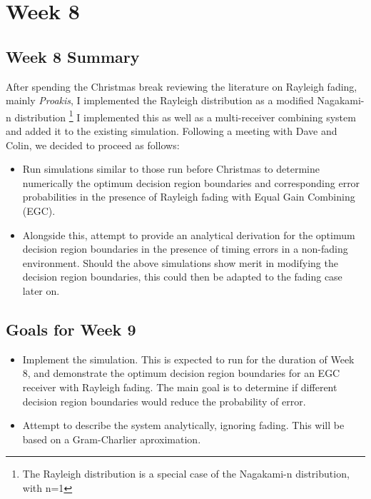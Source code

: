 \section{Week 8}

\subsection{Week 8 Summary}

After spending the Christmas break reviewing the literature on Rayleigh
fading, mainly \emph{Proakis}, I implemented the Rayleigh distribution
as a modified Nagakami-n distribution
\footnote{The Rayleigh distribution is a special case of the Nagakami-n distribution, with n=1}
I implemented this as well as a multi-receiver combining system and
added it to the existing simulation. Following a meeting with Dave and
Colin, we decided to proceed as follows:

\begin{itemize}
\itemsep1pt\parskip0pt
\item
  Run simulations similar to those run before Christmas to determine
  numerically the optimum decision region boundaries and corresponding
  error probabilities in the presence of Rayleigh fading with Equal Gain
  Combining (EGC).
\item
  Alongside this, attempt to provide an analytical derivation for the
  optimum decision region boundaries in the presence of timing errors in
  a non-fading environment. Should the above simulations show merit in
  modifying the decision region boundaries, this could then be adapted
  to the fading case later on.
\end{itemize}

\subsection{Goals for Week 9}

\begin{itemize}
\itemsep1pt\parskip0pt
\item
  Implement the simulation. This is expected to run for the duration of
  Week 8, and demonstrate the optimum decision region boundaries for an
  EGC receiver with Rayleigh fading. The main goal is to determine if
  different decision region boundaries would reduce the probability of
  error.
\item
  Attempt to describe the system analytically, ignoring fading. This
  will be based on a Gram-Charlier aproximation.
\end{itemize}

